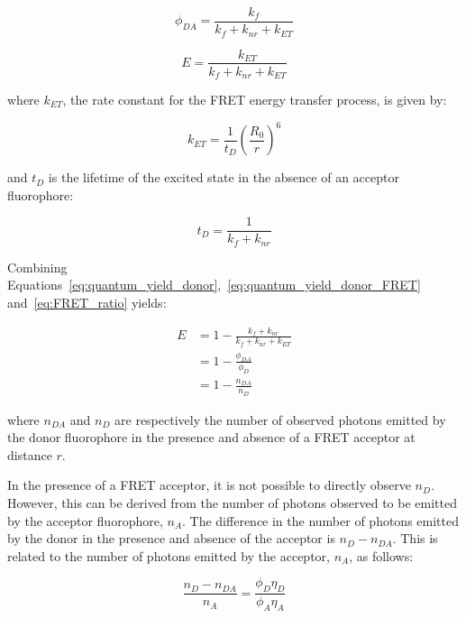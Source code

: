 \begin{equation}
\phi_{DA} = \frac{k_f}{k_f + k_{nr} + k_{ET}}
\label{eq:quantum_yield_donor_FRET}
\end{equation}

\begin{equation}
E = \frac{k_{ET}}{k_f + k_{nr} + k_{ET}}
\label{eq:FRET_ratio}
\end{equation}

where $k_{ET}$, the rate constant for the FRET energy transfer process, is given by:

\begin{equation}
k_{ET} = \frac{1}{t_D} \left(\frac{R_0}{r}\right)^6
\label{eq:k_ET}
\end{equation}

and $t_D$ is the lifetime of the excited state in the absence of an acceptor fluorophore: 

\begin{equation}
t_D = \frac{1}{k_{f} + k_{nr}}
\label{eq:ex_lifetime}
\end{equation}

Combining Equations~\ref{eq:quantum_yield_donor},~\ref{eq:quantum_yield_donor_FRET} and~\ref{eq:FRET_ratio} yields:

\begin{equation}
\begin{split}
E &= 1 - \frac{k_{f} + k_{nr}}{k_f + k_{nr} + k_{ET}} \\ 
&= 1 - \frac{\phi_{DA}}{\phi_{D}} \\
&= 1 - \frac{n_{DA}}{n_{D}}
\label{eq:FRET_ratio_2}
\end{split}
\end{equation}

where $n_{DA}$ and $n_D$ are respectively the number of observed photons emitted by the donor fluorophore in the presence and absence of a FRET acceptor at distance $r$.

In the presence of a FRET acceptor, it is not possible to directly observe $n_D$. However, this can be derived from the number of photons observed to be emitted by the acceptor fluorophore, $n_A$. The difference in the number of photons emitted by the donor in the presence and absence of the acceptor is $n_D - n_{DA}$. This is related to the number of photons emitted by the acceptor, $n_A$, as follows:

\begin{equation}
\frac{n_D - n_{DA}}{n_A} = \frac{\phi_D\eta_D}{\phi_A\eta_A}
\label{eq:ratio_FRET}
\end{equation}

